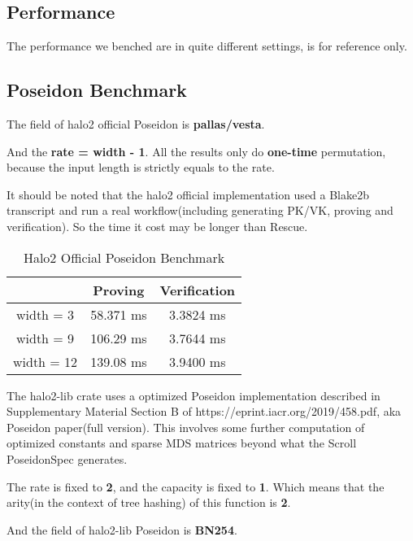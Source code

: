 \documentclass{article}
\begin{document}
\subsection{Performance}

The performance we benched are in quite different settings, is for reference only. 


\subsection{Poseidon Benchmark}

The field of halo2 official Poseidon is \textbf{pallas/vesta}.

And the \textbf{rate = width - 1}. All the results only do \textbf{one-time} permutation, because the input length is strictly equals to the rate.

It should be noted that the halo2 official implementation used a Blake2b transcript and run a real workflow(including generating PK/VK, proving and verification). So the time it cost may be longer than Rescue.

\begin{table}[H]
    \centering
    \begin{tabular}{c|c|c} \hline
         &Proving & Verification  \\ \hline
         width = 3& 58.371 ms & 3.3824 ms \\ \hline
         width = 9& 106.29 ms & 3.7644 ms \\ \hline
         width = 12& 139.08 ms& 3.9400 ms \\ \hline
    \end{tabular}
    \caption{Halo2 Official Poseidon Benchmark}
    \label{tab:my_label}
\end{table}


The halo2-lib crate uses a optimized Poseidon implementation described in Supplementary Material Section B of https://eprint.iacr.org/2019/458.pdf, aka Poseidon paper(full version). This involves some further computation of optimized constants and sparse MDS matrices beyond what the Scroll PoseidonSpec generates.

The rate is fixed to \textbf{2}, and the capacity is fixed to \textbf{1}.
Which means that the arity(in the context of tree hashing) of this function is \textbf{2}.

And the field of halo2-lib Poseidon is \textbf{BN254}.
\end{document}
